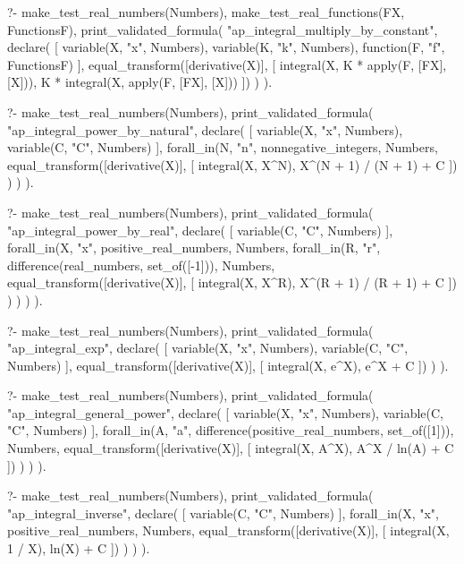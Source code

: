 \begin{prolog}
?-	make_test_real_numbers(Numbers),
	make_test_real_functions(FX, FunctionsF),
	print_validated_formula(
		"ap_integral_multiply_by_constant",
		declare(
			[
				variable(X, "x", Numbers),
				variable(K, "k", Numbers),
				function(F, "f", FunctionsF)
			],
			equal_transform([derivative(X)], [
				integral(X, K * apply(F, [FX], [X])),
				K * integral(X, apply(F, [FX], [X]))
			])
		)
	).
\end{prolog}

\begin{prolog}
?-	make_test_real_numbers(Numbers),
	print_validated_formula(
		"ap_integral_power_by_natural",
		declare(
			[
				variable(X, "x", Numbers),
				variable(C, "C", Numbers)
			],
			forall_in(N, "n", nonnegative_integers, Numbers,
				equal_transform([derivative(X)], [
					integral(X, X^N),
					X^(N + 1) / (N + 1) + C
				])
			)
		)
	).
\end{prolog}

\begin{prolog}
?-	make_test_real_numbers(Numbers),
	print_validated_formula(
		"ap_integral_power_by_real",
		declare(
			[
				variable(C, "C", Numbers)
			],
			forall_in(X, "x", positive_real_numbers, Numbers,
				forall_in(R, "r", difference(real_numbers, set_of([-1])), Numbers,
					equal_transform([derivative(X)], [
						integral(X, X^R),
						X^(R + 1) / (R + 1) + C
					])
				)
			)
		)
	).
\end{prolog}

\begin{prolog}
?-	make_test_real_numbers(Numbers),
	print_validated_formula(
		"ap_integral_exp",
		declare(
			[
				variable(X, "x", Numbers),
				variable(C, "C", Numbers)
			],
			equal_transform([derivative(X)], [
				integral(X, e^X),
				e^X + C
			])
		)
	).
\end{prolog}

\begin{prolog}
?-	make_test_real_numbers(Numbers),
	print_validated_formula(
		"ap_integral_general_power",
		declare(
			[
				variable(X, "x", Numbers),
				variable(C, "C", Numbers)
			],
			forall_in(A, "a", difference(positive_real_numbers, set_of([1])), Numbers,
				equal_transform([derivative(X)], [
					integral(X, A^X),
					A^X / ln(A) + C
				])
			)
		)
	).
\end{prolog}


\begin{prolog}
?-	make_test_real_numbers(Numbers),
	print_validated_formula(
		"ap_integral_inverse",
		declare(
			[
				variable(C, "C", Numbers)
			],
			forall_in(X, "x", positive_real_numbers, Numbers,
				equal_transform([derivative(X)], [
					integral(X, 1 / X),
					ln(X) + C
				])
			)
		)
	).
\end{prolog}
